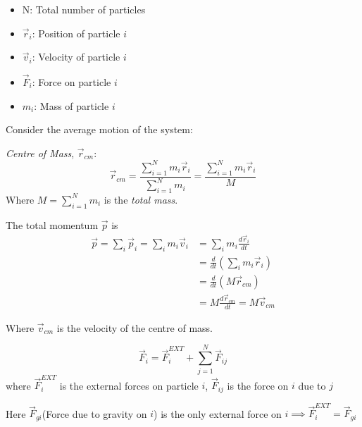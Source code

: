 \documentclass[twoside]{scrartcl}
\begin{document}



\begin{definition}
\begin{itemize}
\item N: Total number of particles
\item $\vec{r}_i$: Position of particle $i$
\item $\vec{v}_i$: Velocity of particle $i$
\item $\vec{F}_i$: Force on particle $i$
 \item $m_i$: Mass of particle $i$
\end{itemize}	
\end{definition}

\vspace*{60pt}

Consider the average motion of the system:

\begin{definition}
\emph{Centre of Mass}, $\vec{r}_{cm}$:
\[\vec{r}_{cm} = \frac{\sum_{i=1}^Nm_i\vec{r}_i}{\sum_{i=1}^Nm_i} =\frac{\sum_{i=1}^Nm_i\vec{r}_i}{M}  \]
Where $M = \sum_{i=1}^Nm_i$ is the \emph{total mass}. 	
\end{definition}


The total momentum $\vec{p}$ is
\[\begin{aligned}\vec{p} = \sum_i\vec{p}_i = \sum_im_i\vec{v}_i &= \sum_i m_i\frac{d\vec{r}_i}{dt} \\
 &= \frac{d}{dt}(\sum_i m_i\vec{r}_i) \\
 &= \frac{d}{dt}(M\vec{r}_{cm}) \\
 &= M\frac{d\vec{r}_{cm}}{dt} = M\vec{v}_{cm}
\end{aligned}
\]

Where $\vec{v}_{cm}$ is the velocity of the centre of mass.


\[\vec{F}_i = \vec{F}_i^{EXT} + \sum_{j=1}^N \vec{F}_{ij}\]
where $\vec{F}_i^{EXT}$ is the external forces on particle $i$, $\vec{F}_{ij}$ is the force on $i$ due to $j$
\begin{example}
\vspace*{45pt}

Here $\vec{F}_{gi}$(Force due to gravity on $i$) is the only external force on $i \implies \vec{F}_i^{EXT} = \vec{F}_{gi}$
	
\end{example}
\end{document}
